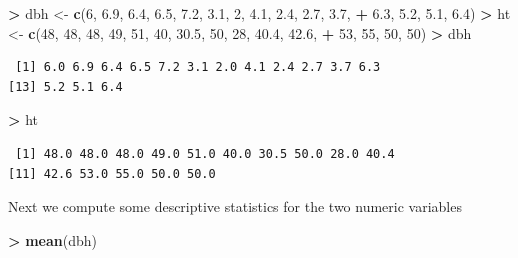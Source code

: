 \documentclass[]{krantz}
\makeatletter
\newenvironment{Shaded}{\begin{snugshade}}{\end{snugshade}}
\newcommand{\DecValTok}[1]{\textcolor[rgb]{0.06,0.06,0.06}{#1}}
\newcommand{\FloatTok}[1]{\textcolor[rgb]{0.06,0.06,0.06}{#1}}
\newcommand{\KeywordTok}[1]{\textcolor[rgb]{0.27,0.27,0.27}{\textbf{#1}}}
\newcommand{\NormalTok}[1]{#1}
\newcommand{\OperatorTok}[1]{\textcolor[rgb]{0.43,0.43,0.43}{\textbf{#1}}}
\newcommand{\StringTok}[1]{\textcolor[rgb]{0.5,0.5,0.5}{#1}}
\newenvironment{kframe}{%
\medskip{}
\setlength{\fboxsep}{.8em}
 \def\at@end@of@kframe{}%
 \ifinner\ifhmode%
  \def\at@end@of@kframe{\end{minipage}}%
  \begin{minipage}{\columnwidth}%
 \fi\fi%
 \def\FrameCommand##1{\hskip\@totalleftmargin \hskip-\fboxsep
 \colorbox{shadecolor}{##1}\hskip-\fboxsep
     \hskip-\linewidth \hskip-\@totalleftmargin \hskip\columnwidth}%
 \MakeFramed {\advance\hsize-\width
   \@totalleftmargin\z@ \linewidth\hsize
   \@setminipage}}%
 {\par\unskip\endMakeFramed%
 \at@end@of@kframe}
\renewenvironment{Shaded}{\begin{kframe}}{\end{kframe}}
\makeatother
\begin{document}
\begin{Shaded}
\begin{Highlighting}[]
\OperatorTok{>}\StringTok{ }\NormalTok{dbh <-}\StringTok{ }\KeywordTok{c}\NormalTok{(}\DecValTok{6}\NormalTok{, }\FloatTok{6.9}\NormalTok{, }\FloatTok{6.4}\NormalTok{, }\FloatTok{6.5}\NormalTok{, }\FloatTok{7.2}\NormalTok{, }\FloatTok{3.1}\NormalTok{, }\DecValTok{2}\NormalTok{, }\FloatTok{4.1}\NormalTok{, }\FloatTok{2.4}\NormalTok{, }\FloatTok{2.7}\NormalTok{, }\FloatTok{3.7}\NormalTok{, }
\OperatorTok{+}\StringTok{   }\FloatTok{6.3}\NormalTok{, }\FloatTok{5.2}\NormalTok{, }\FloatTok{5.1}\NormalTok{, }\FloatTok{6.4}\NormalTok{)}
\OperatorTok{>}\StringTok{ }\NormalTok{ht <-}\StringTok{ }\KeywordTok{c}\NormalTok{(}\DecValTok{48}\NormalTok{, }\DecValTok{48}\NormalTok{, }\DecValTok{48}\NormalTok{, }\DecValTok{49}\NormalTok{, }\DecValTok{51}\NormalTok{, }\DecValTok{40}\NormalTok{, }\FloatTok{30.5}\NormalTok{, }\DecValTok{50}\NormalTok{, }\DecValTok{28}\NormalTok{, }\FloatTok{40.4}\NormalTok{, }\FloatTok{42.6}\NormalTok{, }
\OperatorTok{+}\StringTok{   }\DecValTok{53}\NormalTok{, }\DecValTok{55}\NormalTok{, }\DecValTok{50}\NormalTok{, }\DecValTok{50}\NormalTok{)}
\OperatorTok{>}\StringTok{ }\NormalTok{dbh}
\end{Highlighting}
\end{Shaded}

\begin{verbatim}
 [1] 6.0 6.9 6.4 6.5 7.2 3.1 2.0 4.1 2.4 2.7 3.7 6.3
[13] 5.2 5.1 6.4
\end{verbatim}

\begin{Shaded}
\begin{Highlighting}[]
\OperatorTok{>}\StringTok{ }\NormalTok{ht}
\end{Highlighting}
\end{Shaded}

\begin{verbatim}
 [1] 48.0 48.0 48.0 49.0 51.0 40.0 30.5 50.0 28.0 40.4
[11] 42.6 53.0 55.0 50.0 50.0
\end{verbatim}

Next we compute some descriptive statistics for the two numeric variables

\begin{Shaded}
\begin{Highlighting}[]
\OperatorTok{>}\StringTok{ }\KeywordTok{mean}\NormalTok{(dbh)}
\end{Highlighting}
\end{Shaded}
\end{document}
